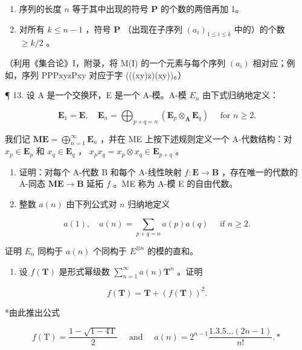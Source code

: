 \begin{enumerate}
\def\labelenumi{(\roman{enumi})}
\item
  序列的长度 \(n\) 等于其中出现的符号 \(\mathbf{P}\) 的个数的两倍再加 1。
\item
  对所有 \(k \leqslant n - 1\) ，符号 \(\mathbf{P}\) （出现在子序列 \((a_i)_{1 \leqslant i \leqslant k}\) 中的）的个数 \(\geqslant k / 2\) 。
\end{enumerate}

（利用《集合论》I，附录，将 M(I) 的一个元素与每个序列 \((a_i)\) 相对应；例如，序列 PPPxyzPxy 对应于字 (((xy)z)(xy))。）

¶ 13. 设 A 是一个交换环，E 是一个 A-模。A-模 \(E_{n}\) 由下式归纳地定义：

\[
\mathbf {E} _ {1} = \mathbf {E}, \quad \mathbf {E} _ {n} = \bigoplus_ {p + q = n} \left(\mathbf {E} _ {p} \otimes_ {\mathbf {A}} \mathbf {E} _ {q}\right) \quad \text { for } n \geqslant 2.
\]

我们记 \(\mathbf{ME} = \bigoplus_{n=1}^{\infty} \mathbf{E}_n\) ，并在 ME 上按下述规则定义一个 A-代数结构：对 \(x_p \in \mathbf{E}_p\) 和 \(x_q \in \mathbf{E}_q\) ， \(x_p x_q = x_p \otimes x_q \in \mathbf{E}_{p+q}\) 。

\begin{enumerate}
\def\labelenumi{(\alph{enumi})}
\item
  证明：对每个 A-代数 B 和每个 A-线性映射 \(f: \mathbf{E} \to \mathbf{B}\) ，存在唯一的代数的 A-同态 \(\mathbf{ME} \to \mathbf{B}\) 延拓 \(f\) 。ME 称为 A-模 E 的自由代数。
\item
  整数 \(a(n)\) 由下列公式对 \(n\) 归纳地定义
\end{enumerate}

\[
a (1), \quad a (n) = \sum_ {p + q = n} a (p) a (q) \quad \text { if } n \geqslant 2.
\]

证明 \(E_{n}\) 同构于 \(a(n)\) 个同构于 \(E^{\otimes n}\) 的模的直和。

\begin{enumerate}
\def\labelenumi{(\alph{enumi})}
\setcounter{enumi}{2}
\tightlist
\item
  设 \(f(\mathbf{T})\) 是形式幂级数 \(\sum_{n=1}^{\infty} a(n)\mathbf{T}^n\) 。证明
\end{enumerate}

\[
f (\mathbf {T}) = \mathbf {T} + (f (\mathbf {T})) ^ {2}.
\]

*由此推出公式

\[
f (\mathrm{T}) = \frac {1 - \sqrt {1 - 4 \mathrm{T}}}{2} \quad \text { and } \quad a (n) = 2 ^ {n - 1} \frac {1 . 3 . 5 \dots (2 n - 1)}{n !}. *
\]

